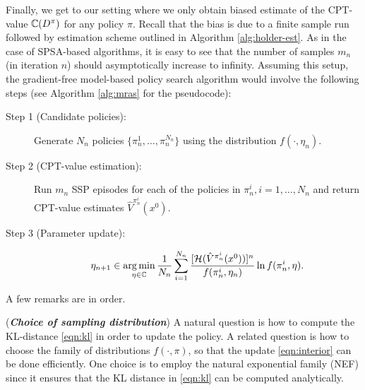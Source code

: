 \documentclass[11pt,letterpaper,english]{article}
\begin{document}
                    
Finally, we get to our setting where we only obtain biased estimate of the CPT-value $\mathbb{C}(D^\pi)$ for any policy $\pi$. Recall that the bias is due to a finite sample run followed by estimation scheme outlined in Algorithm \ref{alg:holder-est}. As in the case of SPSA-based algorithms, it is easy to see that the number of samples $m_n$ (in iteration $n$) should asymptotically increase to infinity. Assuming this setup, the gradient-free model-based policy search algorithm would involve the following steps (see Algorithm \ref{alg:mras} for the pseudocode):

\begin{description}
 \item[Step 1 (Candidate policies):] Generate $N_n$ policies $\{\pi^1_n, \ldots, \pi^{N_n}_n\}$ using the distribution $f(\cdot,\eta_n)$.

\item[Step 2 (CPT-value estimation):] Run $m_n$ SSP episodes for each of the policies in $\pi^i_n, i=1,\ldots, N_n$ and return CPT-value estimates $\hat V^{\pi^i_n}(x^0)$.

\item[Step 3 (Parameter update):]
                         \begin{equation} \label{eqn:step4}
                           \eta_{n+1} \in \mathop{\rm arg\,min}_{\eta \in \mathbb{C}}\frac{1}{N_n}\sum_{i=1}^{N_n}\frac{[\mathcal{H}(\hat V^{\pi^i_n}(x^0))]^n}{ f(\pi_n^i,\eta_n)}\ln f(\pi_n^i,\eta).
                            \end{equation}

\end{description}

                    
A few remarks are in order.
\begin{remark}(\textbf{\textit{Choice of sampling distribution}})
A natural question is how to compute the KL-distance \eqref{eqn:kl} in order to update the policy. A related question is how to choose the family of distributions $f(\cdot,\pi)$, so that the update \eqref{eqn:interior} can be done efficiently. One choice is to employ the natural exponential family (NEF) since it ensures that the KL distance in \eqref{eqn:kl} can be computed analytically. %
\end{remark}
\end{document}
